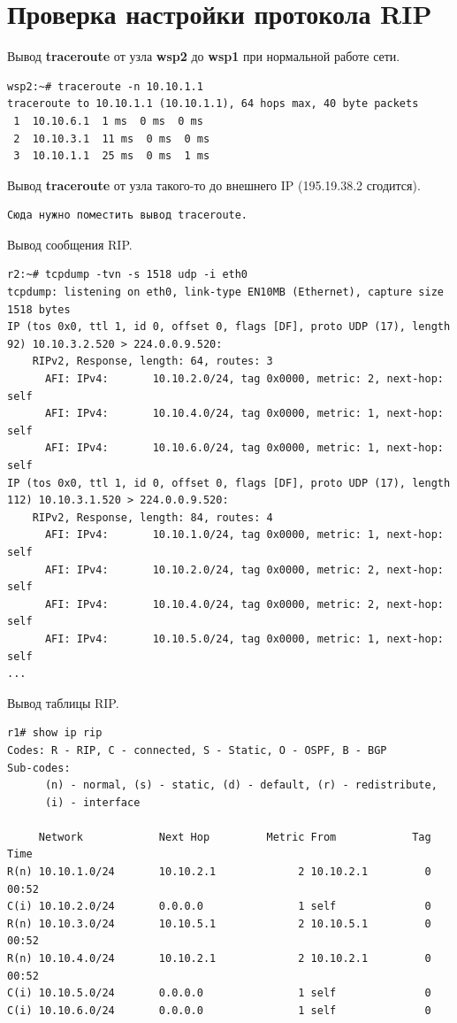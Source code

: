 \documentclass[a4paper,12pt]{article}
\begin{document}
\section{Проверка настройки протокола RIP}

Вывод \textbf{traceroute} от узла \textbf{wsp2} до \textbf{wsp1} при нормальной работе сети.

\begin{Verbatim}
wsp2:~# traceroute -n 10.10.1.1
traceroute to 10.10.1.1 (10.10.1.1), 64 hops max, 40 byte packets
 1  10.10.6.1  1 ms  0 ms  0 ms
 2  10.10.3.1  11 ms  0 ms  0 ms
 3  10.10.1.1  25 ms  0 ms  1 ms
\end{Verbatim}

Вывод \textbf{traceroute} от узла такого-то до внешнего IP (195.19.38.2 сгодится).

\begin{Verbatim}
Сюда нужно поместить вывод traceroute.
\end{Verbatim}

Вывод сообщения RIP.

\begin{Verbatim}
r2:~# tcpdump -tvn -s 1518 udp -i eth0
tcpdump: listening on eth0, link-type EN10MB (Ethernet), capture size 1518 bytes
IP (tos 0x0, ttl 1, id 0, offset 0, flags [DF], proto UDP (17), length 92) 10.10.3.2.520 > 224.0.0.9.520: 
	RIPv2, Response, length: 64, routes: 3
	  AFI: IPv4:       10.10.2.0/24, tag 0x0000, metric: 2, next-hop: self
	  AFI: IPv4:       10.10.4.0/24, tag 0x0000, metric: 1, next-hop: self
	  AFI: IPv4:       10.10.6.0/24, tag 0x0000, metric: 1, next-hop: self
IP (tos 0x0, ttl 1, id 0, offset 0, flags [DF], proto UDP (17), length 112) 10.10.3.1.520 > 224.0.0.9.520: 
	RIPv2, Response, length: 84, routes: 4
	  AFI: IPv4:       10.10.1.0/24, tag 0x0000, metric: 1, next-hop: self
	  AFI: IPv4:       10.10.2.0/24, tag 0x0000, metric: 2, next-hop: self
	  AFI: IPv4:       10.10.4.0/24, tag 0x0000, metric: 2, next-hop: self
	  AFI: IPv4:       10.10.5.0/24, tag 0x0000, metric: 1, next-hop: self
...
\end{Verbatim}

Вывод таблицы RIP.

\begin{Verbatim}
r1# show ip rip
Codes: R - RIP, C - connected, S - Static, O - OSPF, B - BGP
Sub-codes:
      (n) - normal, (s) - static, (d) - default, (r) - redistribute,
      (i) - interface

     Network            Next Hop         Metric From            Tag Time
R(n) 10.10.1.0/24       10.10.2.1             2 10.10.2.1         0 00:52
C(i) 10.10.2.0/24       0.0.0.0               1 self              0
R(n) 10.10.3.0/24       10.10.5.1             2 10.10.5.1         0 00:52
R(n) 10.10.4.0/24       10.10.2.1             2 10.10.2.1         0 00:52
C(i) 10.10.5.0/24       0.0.0.0               1 self              0
C(i) 10.10.6.0/24       0.0.0.0               1 self              0
\end{Verbatim}
\end{document}
